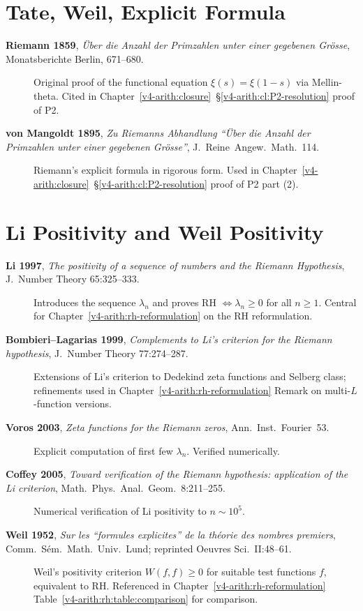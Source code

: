 \section{Tate, Weil, Explicit Formula}
\label{v4-arith:app:A:tate-weil-explicit}

\begin{description}
\item[\textbf{Riemann 1859}, \emph{\"Uber die Anzahl der
Primzahlen unter einer gegebenen Gr\"osse}, Monatsberichte Berlin,
671--680.] Original proof of the functional equation
\(\xi(s)=\xi(1-s)\) via Mellin-theta. Cited in
Chapter~\ref{v4-arith:closure}~\S\ref{v4-arith:cl:P2-resolution}
proof of P2.
\item[\textbf{von Mangoldt 1895}, \emph{Zu Riemanns Abhandlung
``\"Uber die Anzahl der Primzahlen unter einer gegebenen
Gr\"osse''}, J.~Reine~Angew.~Math.~114.] Riemann's explicit
formula in rigorous form. Used in
Chapter~\ref{v4-arith:closure}~\S\ref{v4-arith:cl:P2-resolution}
proof of P2 part (2).
\end{description}

\section{Li Positivity and Weil Positivity}
\label{v4-arith:app:A:li-weil}

\begin{description}
\item[\textbf{Li 1997}, \emph{The positivity of a sequence of
numbers and the Riemann Hypothesis},
J.~Number Theory 65:325--333.]
Introduces the sequence \(\lambda_{n}\) and proves
RH \(\Leftrightarrow\lambda_{n}\geq 0\) for all \(n\geq 1\). Central
for Chapter~\ref{v4-arith:rh-reformulation} on the RH reformulation.
\item[\textbf{Bombieri--Lagarias 1999}, \emph{Complements to Li's
criterion for the Riemann hypothesis}, J.~Number Theory 77:274--287.]
Extensions of Li's criterion to Dedekind zeta functions and
Selberg class; refinements used in
Chapter~\ref{v4-arith:rh-reformulation} Remark on
multi-\(L\)-function versions.
\item[\textbf{Voros 2003}, \emph{Zeta functions for the Riemann
zeros}, Ann.~Inst.~Fourier~53.] Explicit computation of first few
\(\lambda_{n}\). Verified numerically.
\item[\textbf{Coffey 2005}, \emph{Toward verification of the
Riemann hypothesis: application of the Li criterion},
Math.~Phys.~Anal.~Geom.~8:211--255.] Numerical verification of
Li positivity to \(n\sim 10^{5}\).
\item[\textbf{Weil 1952}, \emph{Sur les ``formules explicites'' de
la th\'eorie des nombres premiers}, Comm.~S\'em.~Math.~Univ.~Lund;
reprinted Oeuvres Sci.~II:48--61.] Weil's positivity criterion
\(W(f,f)\geq 0\) for suitable test functions \(f\), equivalent to RH.
Referenced in Chapter~\ref{v4-arith:rh-reformulation}
Table~\ref{v4-arith:rh:table:comparison} for comparison.
\end{description}

